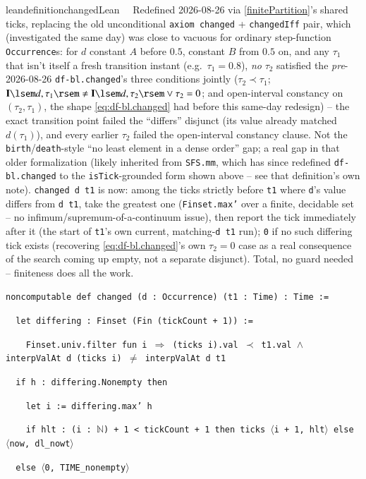 \begin{restatable}{leandefinition}{changedLean}~~ Redefined 2026-08-26 via
\ref{finitePartition}'s shared ticks, replacing the old unconditional \texttt{axiom changed} +
\texttt{changedIff} pair, which (investigated the same day) was close to vacuous for ordinary
step-function \texttt{Occurrence}s: for $d$ constant $A$ before $0.5$, constant $B$ from $0.5$ on, and
any $\tau_1$ that isn't itself a fresh transition instant (e.g.\ $\tau_1=0.8$), \emph{no} $\tau_2$
satisfied the \emph{pre}-2026-08-26 \texttt{df-bl.changed}'s three conditions jointly ($\tau_2\prec\tau_1$;
$\mathbf{I}\lsem d,\tau_1\rsem \neq \mathbf{I}\lsem d,\tau_2\rsem \vee \tau_2=0$; and open-interval constancy
on $(\tau_2,\tau_1)$, the shape \eqref{eq:df-bl.changed} had before this same-day redesign) -- the exact
transition point failed the ``differs'' disjunct (its value already matched $d(\tau_1)$), and every earlier
$\tau_2$ failed the open-interval constancy clause. Not the \texttt{birth}/\texttt{death}-style ``no least
element in a dense order'' gap; a real gap in that older formalization (likely inherited from
\texttt{SFS.mm}, which has since redefined \texttt{df-bl.changed} to the \texttt{isTick}-grounded form
shown above -- see that definition's own note). \texttt{changed d t1} is now: among the ticks strictly before \texttt{t1} where
\texttt{d}'s value differs from \texttt{d t1}, take the greatest one (\texttt{Finset.max'} over a finite,
decidable set -- no infimum/supremum-of-a-continuum issue), then report the tick immediately after it (the
start of \texttt{t1}'s own current, matching-\texttt{d t1} run); \texttt{0} if no such differing tick
exists (recovering \eqref{eq:df-bl.changed}'s own $\tau_2=0$ case as a real consequence of the search
coming up empty, not a separate disjunct). Total, no guard needed -- finiteness does all the work.

\texttt{\textcolor{leancolor}{noncomputable def} \textcolor{leanyellow}{changed} (d : Occurrence) (t1 : Time) : Time :=}

\texttt{~~\textcolor{leancolor}{let} differing : Finset (Fin (tickCount + 1)) :=}

\texttt{~~~~Finset.univ.filter \textcolor{leancolor}{fun} i $\Rightarrow$ (ticks i).val $\prec$ t1.val $\wedge$ interpValAt d (ticks i) $\ne$ interpValAt d t1}

\texttt{~~\textcolor{leancolor}{if} h : differing.Nonempty \textcolor{leancolor}{then}}

\texttt{~~~~\textcolor{leancolor}{let} i := differing.max' h}

\texttt{~~~~\textcolor{leancolor}{if} hlt : (i : $\mathbb{N}$) + 1 < tickCount + 1 \textcolor{leancolor}{then} ticks $\langle$i + 1, hlt$\rangle$ \textcolor{leancolor}{else} $\langle$now, dl\_nowt$\rangle$}

\texttt{~~\textcolor{leancolor}{else} $\langle$0, TIME\_nonempty$\rangle$}
\label{changed}
\end{restatable}

